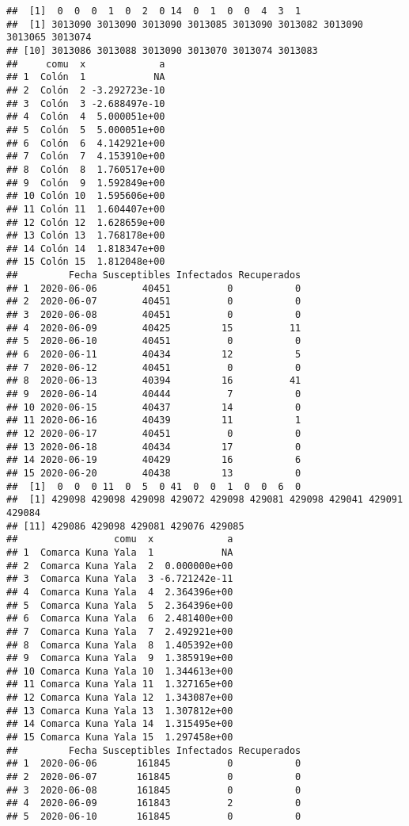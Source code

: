 \documentclass[
]{article}
\begin{document}
\begin{verbatim}
##  [1]  0  0  0  1  0  2  0 14  0  1  0  0  4  3  1
##  [1] 3013090 3013090 3013090 3013085 3013090 3013082 3013090 3013065 3013074
## [10] 3013086 3013088 3013090 3013070 3013074 3013083
##     comu  x             a
## 1  Colón  1            NA
## 2  Colón  2 -3.292723e-10
## 3  Colón  3 -2.688497e-10
## 4  Colón  4  5.000051e+00
## 5  Colón  5  5.000051e+00
## 6  Colón  6  4.142921e+00
## 7  Colón  7  4.153910e+00
## 8  Colón  8  1.760517e+00
## 9  Colón  9  1.592849e+00
## 10 Colón 10  1.595606e+00
## 11 Colón 11  1.604407e+00
## 12 Colón 12  1.628659e+00
## 13 Colón 13  1.768178e+00
## 14 Colón 14  1.818347e+00
## 15 Colón 15  1.812048e+00
##         Fecha Susceptibles Infectados Recuperados
## 1  2020-06-06        40451          0           0
## 2  2020-06-07        40451          0           0
## 3  2020-06-08        40451          0           0
## 4  2020-06-09        40425         15          11
## 5  2020-06-10        40451          0           0
## 6  2020-06-11        40434         12           5
## 7  2020-06-12        40451          0           0
## 8  2020-06-13        40394         16          41
## 9  2020-06-14        40444          7           0
## 10 2020-06-15        40437         14           0
## 11 2020-06-16        40439         11           1
## 12 2020-06-17        40451          0           0
## 13 2020-06-18        40434         17           0
## 14 2020-06-19        40429         16           6
## 15 2020-06-20        40438         13           0
##  [1]  0  0  0 11  0  5  0 41  0  0  1  0  0  6  0
##  [1] 429098 429098 429098 429072 429098 429081 429098 429041 429091 429084
## [11] 429086 429098 429081 429076 429085
##                 comu  x             a
## 1  Comarca Kuna Yala  1            NA
## 2  Comarca Kuna Yala  2  0.000000e+00
## 3  Comarca Kuna Yala  3 -6.721242e-11
## 4  Comarca Kuna Yala  4  2.364396e+00
## 5  Comarca Kuna Yala  5  2.364396e+00
## 6  Comarca Kuna Yala  6  2.481400e+00
## 7  Comarca Kuna Yala  7  2.492921e+00
## 8  Comarca Kuna Yala  8  1.405392e+00
## 9  Comarca Kuna Yala  9  1.385919e+00
## 10 Comarca Kuna Yala 10  1.344613e+00
## 11 Comarca Kuna Yala 11  1.327165e+00
## 12 Comarca Kuna Yala 12  1.343087e+00
## 13 Comarca Kuna Yala 13  1.307812e+00
## 14 Comarca Kuna Yala 14  1.315495e+00
## 15 Comarca Kuna Yala 15  1.297458e+00
##         Fecha Susceptibles Infectados Recuperados
## 1  2020-06-06       161845          0           0
## 2  2020-06-07       161845          0           0
## 3  2020-06-08       161845          0           0
## 4  2020-06-09       161843          2           0
## 5  2020-06-10       161845          0           0

\end{verbatim}
\end{document}
